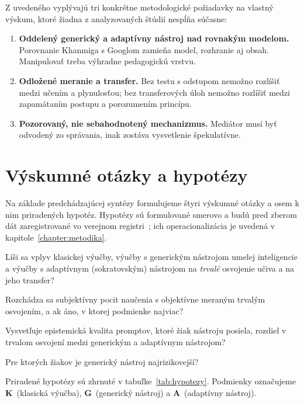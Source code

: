 Z uvedeného vyplývajú tri konkrétne metodologické požiadavky na vlastný výskum, ktoré žiadna z analyzovaných štúdií nespĺňa súčasne:

\begin{enumerate}[nosep]
    \item \textbf{Oddelený generický a adaptívny nástroj nad rovnakým modelom.} Porovnanie Khanmiga s Googlom zamieňa model, rozhranie aj obsah. Manipulovať treba výhradne pedagogickú vrstvu.
    \item \textbf{Odložené meranie a transfer.} Bez testu s odstupom nemožno rozlíšiť medzi učením a plynulosťou; bez transferových úloh nemožno rozlíšiť medzi zapamätaním postupu a porozumením princípu.
    \item \textbf{Pozorovaný, nie sebahodnotený mechanizmus.} Mediátor musí byť odvodený zo správania, inak zostáva vysvetlenie špekulatívne.
\end{enumerate}


\section{Výskumné otázky a hypotézy}
\label{sec:rqhypotezy}

Na základe predchádzajúcej syntézy formulujeme štyri výskumné otázky a osem k nim priradených hypotéz. Hypotézy sú formulované smerovo a budú pred zberom dát zaregistrované vo verejnom registri~\cite{nosek2018preregistration,osf_preregistration}; ich operacionalizácia je uvedená v kapitole~\ref{chapter:metodika}.

\begin{description}[leftmargin=2.1cm, style=nextline, nosep]
    \item[VO1] Líši sa vplyv klasickej výučby, výučby s generickým nástrojom umelej inteligencie a výučby s adaptívnym (sokratovským) nástrojom na \emph{trvalé} osvojenie učiva a na jeho transfer?
    \item[VO2] Rozchádza sa subjektívny pocit naučenia s objektívne meraným trvalým osvojením, a ak áno, v ktorej podmienke najviac?
    \item[VO3] Vysvetľuje epistemická kvalita promptov, ktoré žiak nástroju posiela, rozdiel v trvalom osvojení medzi generickým a adaptívnym nástrojom?
    \item[VO4] Pre ktorých žiakov je generický nástroj najrizikovejší?
\end{description}

\noindent Priradené hypotézy sú zhrnuté v tabuľke~\ref{tab:hypotezy}. Podmienky označujeme \textbf{K}~(klasická výučba), \textbf{G}~(generický nástroj) a \textbf{A}~(adaptívny nástroj).

